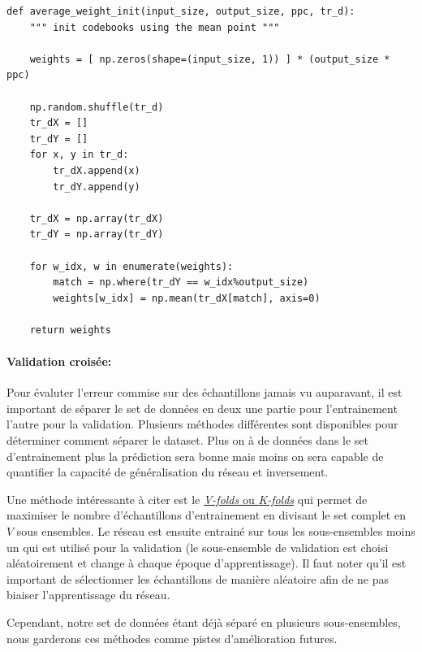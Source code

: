 \documentclass[11pt]{article}
\begin{document}
\begin{lstlisting}
def average_weight_init(input_size, output_size, ppc, tr_d):
    """ init codebooks using the mean point """

    weights = [ np.zeros(shape=(input_size, 1)) ] * (output_size * ppc)

    np.random.shuffle(tr_d)
    tr_dX = []
    tr_dY = []
    for x, y in tr_d:
        tr_dX.append(x)
        tr_dY.append(y)

    tr_dX = np.array(tr_dX)
    tr_dY = np.array(tr_dY)

    for w_idx, w in enumerate(weights):
        match = np.where(tr_dY == w_idx%output_size)
        weights[w_idx] = np.mean(tr_dX[match], axis=0)

    return weights
\end{lstlisting}
\newpage



\paragraph{Validation crois\'ee:} Pour \'evaluter l'erreur commise sur des
\'echantillons jamais vu auparavant, il est
important de s\'eparer le set de donn\'ees en deux une partie pour l'entrainement
l'autre pour la validation. Plusieurs m\'ethodes diff\'erentes sont disponibles
pour d\'eterminer comment s\'eparer le dataset. Plus on \`a de donn\'ees dans le set
d'entrainement plus la pr\'ediction sera bonne mais moins on sera capable de
quantifier la capacit\'e de g\'en\'eralisation du r\'eseau et inversement.

Une m\'ethode int\'eressante \`a citer est le \href{http://work.caltech.edu/slides/slides13.pdf}
{\emph{V-folds} ou \emph{K-folds}} qui permet de maximiser le nombre d'\'echantillons
d'entrainement en divisant le set complet en $V$ sous ensembles. Le r\'eseau est
ensuite entrain\'e sur tous les sous-ensembles moins un qui est utilis\'e pour la
validation (le sous-ensemble de validation est choisi al\'eatoirement et change
\`a chaque \'epoque d'apprentissage). Il faut noter qu'il est important de
s\'electionner les \'echantillons de mani\`ere al\'eatoire afin de ne pas biaiser
l'apprentissage du r\'eseau.

Cependant, notre set de donn\'ees \'etant d\'ej\`a s\'epar\'e en plusieurs sous-ensembles,
nous garderons ces m\'ethodes comme pistes d'am\'elioration futures.
\end{document}
